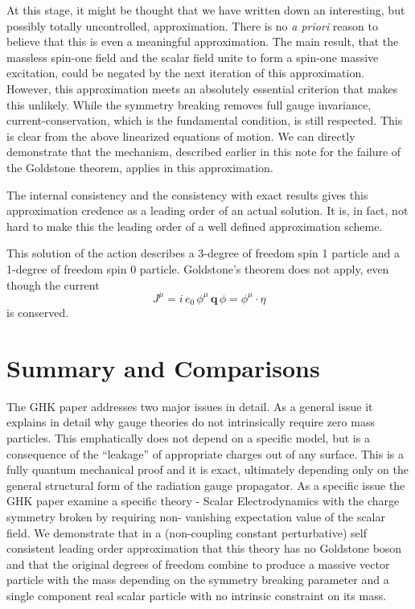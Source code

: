 \documentclass[preprintnumbers,12pt]{revtex4-2}
\begin{document}
At this stage, it might be thought that we have written down an
interesting, but possibly totally uncontrolled, approximation. There
is no \emph{a priori} reason to believe that this is even a meaningful
approximation. The main result, that the massless spin-one field and
the scalar field unite to form a spin-one massive excitation, could be
negated by the next iteration of this approximation. However, this
approximation meets an absolutely essential criterion that makes this
unlikely. While the symmetry breaking removes full gauge invariance,
current-conservation, which is the fundamental condition, is still
respected. This is clear from the above linearized equations of
motion. We can directly demonstrate that the mechanism, described
earlier in this note for the failure of the Goldstone theorem, applies
in this approximation.

The internal consistency and the consistency with exact results gives
this approximation credence as a leading order of an actual
solution. It is, in fact, not hard to make this the leading order of a
well defined approximation scheme.

This solution of the action describes a 3-degree of freedom
spin 1 particle and a 1-degree of freedom spin 0 particle.
Goldstone's theorem does not apply, even though the current
\begin{equation*}
  J^{\mu} = i\, e_0\, \phi^{\mu}\, \mathbf{q}\, \phi = \phi^{\mu}\cdot \eta
\end{equation*}
is conserved.


\section{Summary and Comparisons}

The GHK paper addresses two major issues in detail.  As a general
issue it explains in detail why gauge theories do not
intrinsically require zero mass particles. This emphatically does not
depend on a specific model, but is a consequence of the ``leakage'' of
appropriate charges out of any surface. This is a fully quantum
mechanical proof and it is exact, ultimately depending only on the
general structural form of the radiation gauge propagator.  As a
specific issue the GHK paper examine a specific theory - Scalar
Electrodynamics with the charge symmetry broken by requiring non-
vanishing expectation value of the scalar field. We demonstrate that
in a (non-coupling constant perturbative) self consistent leading
order approximation that this theory has no Goldstone boson and that
the original degrees of freedom combine to produce a massive vector
particle with the mass depending on the symmetry breaking parameter
and a single component real scalar particle with no intrinsic
constraint on its mass.
\end{document}
